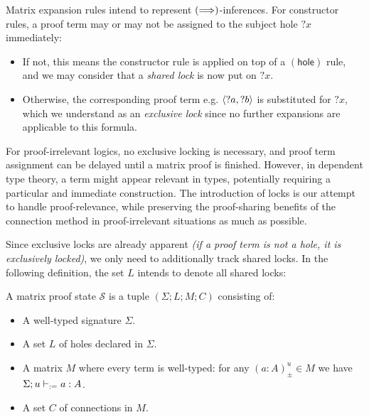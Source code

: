 \documentclass[twoside]{report}
\begin{document}
Matrix expansion rules intend to represent $(\Longrightarrow)$-inferences. For constructor rules, a proof term may or may not be assigned to the subject hole ${?x}$ immediately:
\begin{itemize}
    \item If not, this means the constructor rule is applied on top of a $(\mathsf{hole})$ rule, and we may consider that a \emph{shared lock} is now put on ${?x}$.

    \item Otherwise, the corresponding proof term e.g. $\langle{?a}, {?b}\rangle$ is substituted for ${?x}$, which we understand as an \emph{exclusive lock} since no further expansions are applicable to this formula.
\end{itemize}

For proof-irrelevant logics, no exclusive locking is necessary, and proof term assignment can be delayed until a matrix proof is finished. However, in dependent type theory, a term might appear relevant in types, potentially requiring a particular and immediate construction. The introduction of locks is our attempt to handle proof-relevance, while preserving the proof-sharing benefits of the connection method in proof-irrelevant situations as much as possible.

Since exclusive locks are already apparent \emph{(if a proof term is not a hole, it is exclusively locked)}, we only need to additionally track shared locks. In the following definition, the set $L$ intends to denote all shared locks:

\begin{definition}
\label{def:matrix_states}
A matrix proof state $\mathcal S$ is a tuple $(\Sigma; L; M; C)$ consisting of:
\begin{itemize}[noitemsep]
    \item A well-typed signature $\Sigma$.
    \item A set $L$ of holes declared in $\Sigma$.
    \item A matrix $M$ where every term is well-typed: for any $(a : A)^u_{\pm} \in M$ we have $\Sigma; u \vdash_{:=} a : A$.
    \item A set $C$ of connections in $M$.
\end{itemize}
\end{definition}
\end{document}
